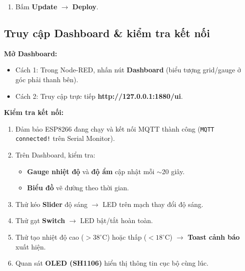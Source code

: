\documentclass[13pt,a4paper]{article}
\newcommand{\code}[1]{\texttt{#1}}
\begin{document}
\begin{enumerate}[label=\arabic*., leftmargin=1.5cm, resume]
    \item Bấm \textbf{Update} $\rightarrow$ \textbf{Deploy}.
\end{enumerate}

\subsection{Truy cập Dashboard \& kiểm tra kết nối}
\label{sec:test}

\textbf{Mở Dashboard:}

\begin{itemize}
    \item Cách 1: Trong Node-RED, nhấn nút \textbf{Dashboard} (biểu tượng grid/gauge ở góc phải thanh bên).
    \item Cách 2: Truy cập trực tiếp \textbf{http://127.0.0.1:1880/ui}.
\end{itemize}

\textbf{Kiểm tra kết nối:}

\begin{enumerate}[label=\arabic*., leftmargin=1.5cm]
    \item Đảm bảo ESP8266 đang chạy và kết nối MQTT thành công (\code{MQTT connected!} trên Serial Monitor).
    \item Trên Dashboard, kiểm tra:
    \begin{itemize}
        \item \textbf{Gauge nhiệt độ} và \textbf{độ ẩm} cập nhật mỗi $\sim$20 giây.
        \item \textbf{Biểu đồ} vẽ đường theo thời gian.
    \end{itemize}
    \item Thử kéo \textbf{Slider} độ sáng $\rightarrow$ LED trên mạch thay đổi độ sáng.
    \item Thử gạt \textbf{Switch} $\rightarrow$ LED bật/tắt hoàn toàn.
    \item Thử tạo nhiệt độ cao ($>38^\circ$C) hoặc thấp ($<18^\circ$C) $\rightarrow$ \textbf{Toast cảnh báo} xuất hiện.
    \item Quan sát \textbf{OLED (SH1106)} hiển thị thông tin cục bộ cùng lúc.
\end{enumerate}

\end{document}
